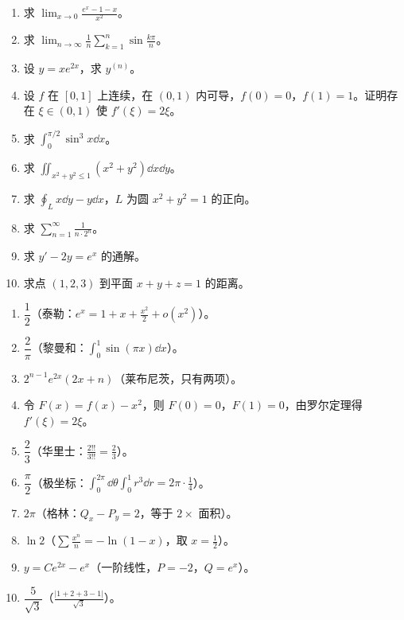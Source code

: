 \begin{enumerate}[leftmargin=2.0em,itemsep=6pt]
\item 求 $\displaystyle\lim_{x\to0}\frac{e^x-1-x}{x^2}$。
\item 求 $\displaystyle\lim_{n\to\infty}\frac1n\sum_{k=1}^{n}\sin\frac{k\pi}{n}$。
\item 设 $y=xe^{2x}$，求 $y^{(n)}$。
\item 设 $f$ 在 $[0,1]$ 上连续，在 $(0,1)$ 内可导，$f(0)=0$，$f(1)=1$。证明存在 $\xi\in(0,1)$ 使 $f'(\xi)=2\xi$。
\item 求 $\displaystyle\int_0^{\pi/2}\sin^3x\dd x$。
\item 求 $\displaystyle\iint_{x^2+y^2\le1}(x^2+y^2)\dd x\dd y$。
\item 求 $\displaystyle\oint_L x\dd y-y\dd x$，$L$ 为圆 $x^2+y^2=1$ 的正向。
\item 求 $\displaystyle\sum_{n=1}^{\infty}\frac{1}{n\cdot2^n}$。
\item 求 $y'-2y=e^x$ 的通解。
\item 求点 $(1,2,3)$ 到平面 $x+y+z=1$ 的距离。
\end{enumerate}

\vspace{6pt}

\begin{enumerate}[leftmargin=2.0em,itemsep=3pt]
\item $\dfrac12$（泰勒：$e^x=1+x+\frac{x^2}{2}+o(x^2)$）。
\item $\dfrac{2}{\pi}$（黎曼和：$\displaystyle\int_0^1\sin(\pi x)\dd x$）。
\item $2^{n-1}e^{2x}(2x+n)$（莱布尼茨，只有两项）。
\item 令 $F(x)=f(x)-x^2$，则 $F(0)=0$，$F(1)=0$，由罗尔定理得 $f'(\xi)=2\xi$。
\item $\dfrac23$（华里士：$\frac{2!!}{3!!}=\frac23$）。
\item $\dfrac{\pi}{2}$（极坐标：$\int_0^{2\pi}\dd\theta\int_0^1r^3\dd r=2\pi\cdot\frac14$）。
\item $2\pi$（格林：$Q_x-P_y=2$，等于 $2\times$ 面积）。
\item $\ln2$（$\sum\frac{x^n}{n}=-\ln(1-x)$，取 $x=\frac12$）。
\item $y=Ce^{2x}-e^x$（一阶线性，$P=-2$，$Q=e^x$）。
\item $\dfrac{5}{\sqrt3}$（$\frac{|1+2+3-1|}{\sqrt3}$）。
\end{enumerate}

\vspace{10pt}
\flowerrule

